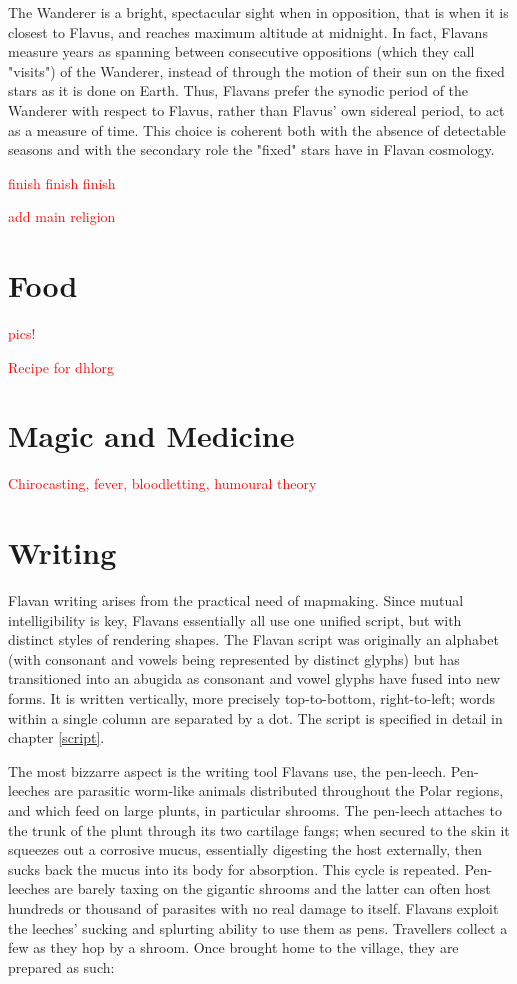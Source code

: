 \documentclass[10pt,oneside]{memoir}
\newcommand{\cmmnt}[1]{\textcolor{red}{#1}}
\begin{document}
The Wanderer is a bright, spectacular sight when in opposition, that is when it is closest to Flavus, and reaches maximum altitude at midnight. In fact, Flavans measure years as spanning between consecutive oppositions (which they call "visits") of the Wanderer, instead of through the motion of their sun on the fixed stars as it is done on Earth. Thus, Flavans prefer the synodic period of the Wanderer with respect to Flavus, rather than Flavus' own sidereal period, to act as a measure of time. This choice is coherent both with the absence of detectable seasons and with the secondary role the "fixed" stars have in Flavan cosmology.

\cmmnt{finish finish finish}

\cmmnt{add main religion}

\pagebreak

\section{Food}

\cmmnt{pics!}

\cmmnt{Recipe for dhlorg}

\vfill

\section{Magic and Medicine}

\cmmnt{Chirocasting, fever, bloodletting, humoural theory}


\newpage
\section{Writing}

Flavan writing arises from the practical need of mapmaking. Since mutual intelligibility is key, Flavans essentially all use one unified script, but with distinct styles of rendering shapes. The Flavan script was originally an alphabet (with consonant and vowels being represented by distinct glyphs) but has transitioned into an abugida as consonant and vowel glyphs have fused into new forms. It is written vertically, more precisely top-to-bottom, right-to-left; words within a single column are separated by a dot. The script is specified in detail in chapter \ref{script}.

The most bizzarre aspect is the writing tool Flavans use, the pen-leech. Pen-leeches are parasitic worm-like animals distributed throughout the Polar regions, and which feed on large plunts, in particular shrooms. The pen-leech attaches to the trunk of the plunt through its two cartilage fangs; when secured to the skin it squeezes out a corrosive mucus, essentially digesting the host externally, then sucks back the mucus into its body for absorption. This cycle is repeated. Pen-leeches are barely taxing on the gigantic shrooms and the latter can often host hundreds or thousand of parasites with no real damage to itself. Flavans exploit the leeches' sucking and splurting ability to use them as pens. Travellers collect a few as they hop by a shroom. Once brought home to the village, they are prepared as such:
\end{document}

